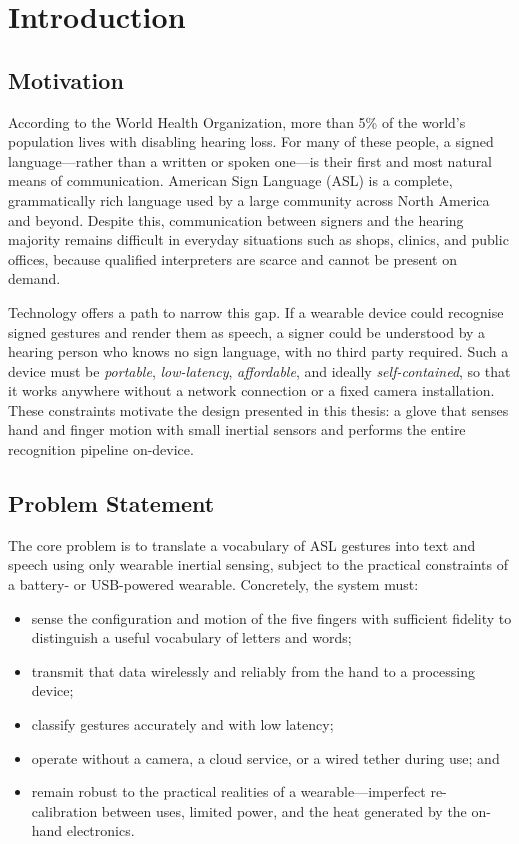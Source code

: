 \chapter{Introduction}

\section{Motivation}

According to the World Health Organization, more than 5\% of the world's
population lives with disabling hearing loss. For many of these people, a
signed language—rather than a written or spoken one—is their first and most
natural means of communication. American Sign Language (ASL) is a complete,
grammatically rich language used by a large community across North America and
beyond. Despite this, communication between signers and the hearing majority
remains difficult in everyday situations such as shops, clinics, and public
offices, because qualified interpreters are scarce and cannot be present on
demand.

Technology offers a path to narrow this gap. If a wearable device could
recognise signed gestures and render them as speech, a signer could be
understood by a hearing person who knows no sign language, with no third party
required. Such a device must be \emph{portable}, \emph{low-latency},
\emph{affordable}, and ideally \emph{self-contained}, so that it works anywhere
without a network connection or a fixed camera installation. These constraints
motivate the design presented in this thesis: a glove that senses hand and
finger motion with small inertial sensors and performs the entire recognition
pipeline on-device.

\section{Problem Statement}

The core problem is to translate a vocabulary of ASL gestures into text and
speech using only wearable inertial sensing, subject to the practical
constraints of a battery- or USB-powered wearable. Concretely, the system must:

\begin{itemize}
    \item sense the configuration and motion of the five fingers with
    sufficient fidelity to distinguish a useful vocabulary of letters and
    words;
    \item transmit that data wirelessly and reliably from the hand to a
    processing device;
    \item classify gestures accurately and with low latency;
    \item operate without a camera, a cloud service, or a wired tether during
    use; and
    \item remain robust to the practical realities of a wearable—imperfect
    re-calibration between uses, limited power, and the heat generated by the
    on-hand electronics.
\end{itemize}


